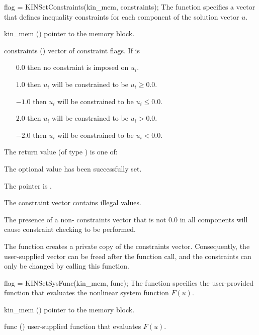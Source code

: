 {
flag = KINSetConstraints(kin\_mem, constraints);
}
{
  The function  specifies a vector that defines
  inequality constraints for each component of the solution vector $u$.
}
{
  \begin{args}[constraints]
  \item[kin\_mem] ()
    pointer to the {\kinsol} memory block.
  \item[constraints] ()
    vector of constraint flags. If  is
    \begin{itemize}    
    \item[$0.0$] then no constraint is imposed on $u_i$. 
    \item[$1.0$] then $u_i$ will be constrained to be $u_i \ge 0.0$.
    \item[$-1.0$] then $u_i$ will be constrained to be $u_i \le 0.0$.
    \item[$2.0$] then $u_i$ will be constrained to be $u_i > 0.0$.
    \item[$-2.0$] then $u_i$ will be constrained to be $u_i < 0.0$.
    \end{itemize}
  \end{args}
}
{
  The return value  (of type ) is one of:
  \begin{args}
  \item[\Id{KIN\_SUCCESS}] 
    The optional value has been successfully set.
  \item[\Id{KIN\_MEM\_NULL}]
    The  pointer is .
  \item[\Id{KIN\_ILL\_INPUT}]
    The constraint vector contains illegal values.
  \end{args}
}
{
  The presence of a non- constraints vector that is not $0.0$ in
  all components will cause constraint checking to be performed.

  The function creates a private copy of the constraints vector. Consequently,
  the user-supplied vector can be freed after the function call, and
  the constraints can only be changed by calling this function.
}
{
flag = KINSetSysFunc(kin\_mem, func);
}
{
  The function  specifies the user-provided function
  that evaluates the nonlinear system function $F(u)$.
}
{
  \begin{args}
  \item[kin\_mem] ()
    pointer to the {\kinsol} memory block.
  \item[func] ()
    user-supplied function that evaluates $F(u)$.
  \end{args}
}
